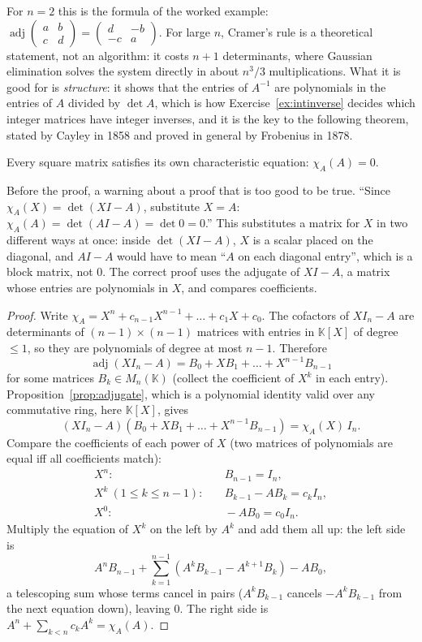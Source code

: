 For $n=2$ this is the formula of the worked example: $\operatorname{adj}\begin{pmatrix}a&b\\c&d\end{pmatrix}=\begin{pmatrix}d&-b\\-c&a\end{pmatrix}$. For large $n$, Cramer's rule is a theoretical statement, not an algorithm: it costs $n+1$ determinants, where Gaussian elimination solves the system directly in about $n^3/3$ multiplications. What it is good for is \emph{structure}: it shows that the entries of $A^{-1}$ are polynomials in the entries of $A$ divided by $\det A$, which is how Exercise~\ref{ex:intinverse} decides which integer matrices have integer inverses, and it is the key to the following theorem, stated by Cayley in 1858 and proved in general by Frobenius in 1878.

\begin{theorem}\label{thm:cayleyhamilton}
Every square matrix satisfies its own characteristic equation: $\chi_A(A)=0$.
\end{theorem}

Before the proof, a warning about a proof that is too good to be true. ``Since $\chi_A(X)=\det(XI-A)$, substitute $X=A$: $\chi_A(A)=\det(AI-A)=\det0=0$.'' This substitutes a matrix for $X$ in two different ways at once: inside $\det(XI-A)$, $X$ is a scalar placed on the diagonal, and $AI-A$ would have to mean ``$A$ on each diagonal entry'', which is a block matrix, not $0$. The correct proof uses the adjugate of $XI-A$, a matrix whose entries are polynomials in $X$, and compares coefficients.

\begin{proof}
Write $\chi_A=X^n+c_{n-1}X^{n-1}+\dots+c_1X+c_0$. The cofactors of $XI_n-A$ are determinants of $(n-1)\times(n-1)$ matrices with entries in $\mathbb K[X]$ of degree $\le1$, so they are polynomials of degree at most $n-1$. Therefore
\[
\operatorname{adj}(XI_n-A)=B_0+XB_1+\dots+X^{n-1}B_{n-1}
\]
for some matrices $B_k\in M_n(\mathbb K)$ (collect the coefficient of $X^k$ in each entry). Proposition~\ref{prop:adjugate}, which is a polynomial identity valid over any commutative ring, here $\mathbb K[X]$, gives
\[
(XI_n-A)\left(B_0+XB_1+\dots+X^{n-1}B_{n-1}\right)=\chi_A(X)\,I_n.
\]
Compare the coefficients of each power of $X$ (two matrices of polynomials are equal iff all coefficients match):
\[
\begin{aligned}
X^n:&\quad B_{n-1}=I_n,\\
X^k\ (1\le k\le n-1):&\quad B_{k-1}-AB_k=c_kI_n,\\
X^0:&\quad -AB_0=c_0I_n.
\end{aligned}
\]
Multiply the equation of $X^k$ on the left by $A^k$ and add them all up: the left side is
\[
A^nB_{n-1}+\sum_{k=1}^{n-1}\left(A^kB_{k-1}-A^{k+1}B_k\right)-AB_0 ,
\]
a telescoping sum whose terms cancel in pairs ($A^kB_{k-1}$ cancels $-A^{k}B_{k-1}$ from the next equation down), leaving $0$. The right side is $A^n+\sum_{k<n}c_kA^k=\chi_A(A)$.
\end{proof}

